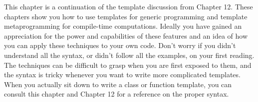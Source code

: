 This chapter is a continuation of the template discussion from Chapter 12. These chapters show you how to use templates for generic programming and template metaprogramming for compile-time computations. Ideally you have gained an appreciation for the power and capabilities of these features and an idea of how you can apply these techniques to your own code. Don’t worry if you didn’t understand all the syntax, or didn’t follow all the examples, on your first reading. The techniques can be difficult to grasp when you are first exposed to them, and the syntax is tricky whenever you want to write more complicated templates. When you actually sit down to write a class or function template, you can consult this chapter and Chapter 12 for a reference on the proper syntax.